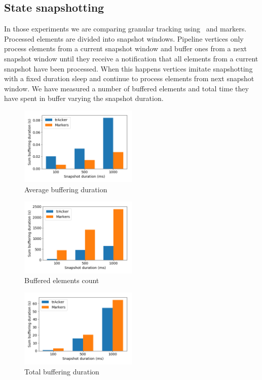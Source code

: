 \subsection{State snapshotting} \label{snapshotting}

In those experiments we are comparing granular tracking using \tracker\ and markers. Processed elements are divided into snapshot windows. Pipeline vertices only process elements from a current snapshot window and buffer ones from a next snapshot window until they receive a notification that all elements from a current snapshot have been processed. When this happens vertices imitate snapshotting with a fixed duration sleep and continue to process elements from next snapshot window. We have measured a number of buffered elements and total time they have spent in buffer varying the snapshot duration.

\begin{figure}[htbp]
  \centering
  \includegraphics[width=0.50\textwidth]{pics/buffering_average_duration_bars.png}
  \caption{Average buffering duration}
\end{figure}
\begin{figure}[htbp]
  \centering
  \includegraphics[width=0.50\textwidth]{pics/buffering_count_bars.png}
  \caption{Buffered elements count}
\end{figure}
\begin{figure}[htbp]
  \centering
  \includegraphics[width=0.50\textwidth]{pics/buffering_sum_duration_bars.png}
  \caption{Total buffering duration}
\end{figure}

